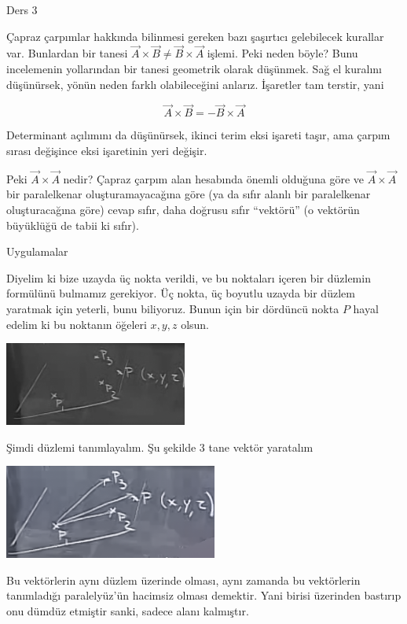 \documentclass[12pt,fleqn]{article}\usepackage{../../common}
\begin{document}
Ders 3

Çapraz çarpımlar hakkında bilinmesi gereken bazı şaşırtıcı gelebilecek kurallar
var. Bunlardan bir tanesi $\vec{A} \times \vec{B} \ne \vec{B} \times \vec{A}$
işlemi. Peki neden böyle? Bunu incelemenin yollarından bir tanesi geometrik
olarak düşünmek. Sağ el kuralını düşünürsek, yönün neden farklı olabileceğini
anlarız. İşaretler tam terstir, yani

$$  \vec{A} \times \vec{B} = - \vec{B}\times \vec{A} $$

Determinant açılımını da düşünürsek, ikinci terim eksi işareti taşır, ama çarpım
sırası değişince eksi işaretinin yeri değişir.

Peki $\vec{A} \times \vec{A}$ nedir? Çapraz çarpım alan hesabında önemli
olduğuna göre ve $\vec{A} \times \vec{A}$ bir paralelkenar oluşturamayacağına
göre (ya da sıfır alanlı bir paralelkenar oluşturacağına göre) cevap sıfır, daha
doğrusu sıfır ``vektörü'' (o vektörün büyüklüğü de tabii ki sıfır).

Uygulamalar

Diyelim ki bize uzayda üç nokta verildi, ve bu noktaları içeren bir düzlemin
formülünü bulmamız gerekiyor. Üç nokta, üç boyutlu uzayda bir düzlem yaratmak
için yeterli, bunu biliyoruz. Bunun için bir dördüncü nokta $P$ hayal edelim ki
bu noktanın öğeleri $x,y,z$ olsun.

\begin{center}
\includegraphics[width=6cm]{3_1.png}
\end{center}

Şimdi düzlemi tanımlayalım. Şu şekilde 3 tane vektör
yaratalım

\begin{center}
\includegraphics[width=7cm]{3_2.png}
\end{center}

Bu vektörlerin aynı düzlem üzerinde olması, aynı zamanda bu vektörlerin
tanımladığı paralelyüz'ün hacimsiz olması demektir. Yani birisi üzerinden
bastırıp onu dümdüz etmiştir sanki, sadece alanı kalmıştır.
\end{document}
